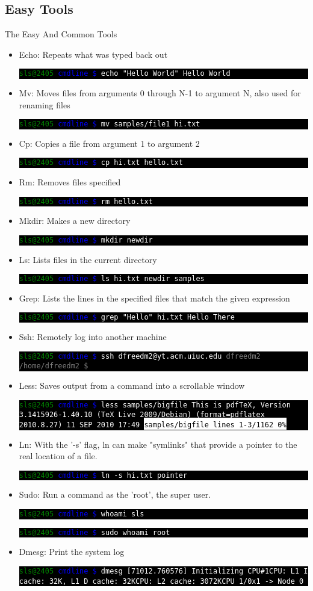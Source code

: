 \documentclass[10pt]{beamer}
\makeatletter
\newcommand{\codeblock}[1]
{
  \colorbox{black}{
    \begin{minipage}{\linewidth}
      \texttt{\textcolor{green}{sls@2405} \textcolor{blue}{cmdline \$} \textcolor{white}{#1}}
    \end{minipage}
  }
}
\newcommand{\codeblockWO}[2]
{
  \colorbox{black}{
    \begin{minipage}{\linewidth}
      \texttt{\textcolor{green}{sls@2405} \textcolor{blue}{cmdline \$} \textcolor{white}{#1}
      \newline
      \textcolor{white}{#2}}
    \end{minipage}
  }
}
\makeatother
\begin{document}
\subsection{Easy Tools}
\begin{frame}[allowframebreaks]{The Easy And Common Tools}
\begin{itemize}
\item Echo: Repeats what was typed back out
\codeblockWO{echo "Hello World"}{Hello World}

\item Mv: Moves files from arguments 0 through N-1 to argument N, also used for renaming files
\codeblock{mv samples/file1 hi.txt}

\item Cp: Copies a file from argument 1 to argument 2
\codeblock{cp hi.txt hello.txt}

\item Rm: Removes files specified
\codeblock{rm hello.txt}

\item Mkdir: Makes a new directory
\codeblock{mkdir newdir}

\item Ls: Lists files in the current directory
\codeblockWO{ls}{hi.txt\newline~newdir\newline~samples}

\item Grep: Lists the lines in the specified files that match the given expression
\codeblockWO{grep "Hello" hi.txt}{Hello There}

\item Ssh: Remotely log into another machine
\codeblockWO{ssh dfreedm2@yt.acm.uiuc.edu}{\textcolor{gray}{dfreedm2 /home/dfreedm2 \$}}

\item Less: Saves output from a command into a scrollable window
\codeblockWO{less samples/bigfile}{This is pdfTeX, Version 3.1415926-1.40.10 (TeX Live 2009/Debian) (format=pdflatex 2010.8.27)  11 SEP 2010 17:49\newline~\colorbox{white}{\textcolor{black}{samples/bigfile lines 1-3/1162 0\%}}}

\item Ln: With the '-s' flag, ln can make "symlinks" that provide a pointer to the real location of a file.
\codeblock{ln -s hi.txt pointer}

\item Sudo: Run a command as the 'root', the super user.
\codeblockWO{whoami}{sls}
\codeblockWO{sudo whoami}{root}

\item Dmesg: Print the system log
\codeblockWO{dmesg}{[71012.760576] Initializing CPU\#1\newline
[71012.760576] CPU: L1 I cache: 32K, L1 D cache: 32K\newline
[71012.760576] CPU: L2 cache: 3072K\newline
[71012.760576] CPU 1/0x1 -> Node 0}

\end{itemize}
\end{frame}
\end{document}

